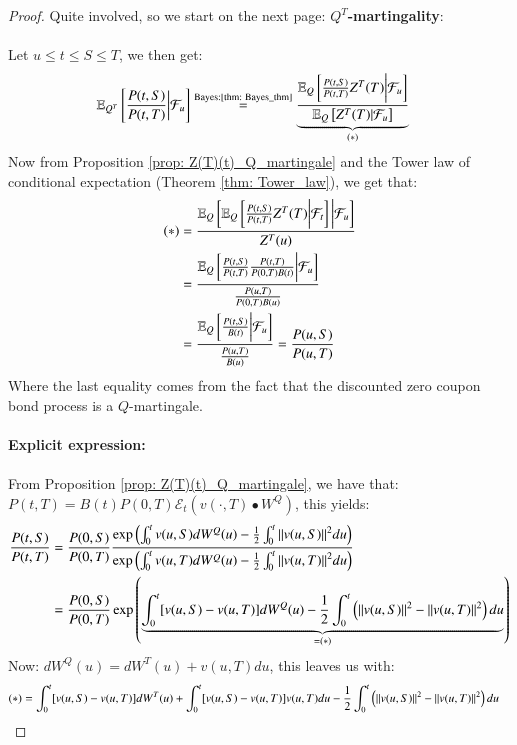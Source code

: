 \begin{proof}
Quite involved, so we start on the next page: 
\newpage 
\textbf{$Q^{T}$-martingality}: 
\\~\\ 
Let $u\leq t \leq S\leq T$, we then get: 
\begin{align*}
\mathbb{E}_{Q^{T}}\left[
\frac{P(t,S)}{P(t,T)}\bigg{|}\mathcal{F}_{u}
\right] 
&\stackrel{\text{Bayes:\ref{thm: Bayes_thm}}}{=}
\underbrace{\frac{
\mathbb{E}_{Q}\left[
\frac{P(t,S)}{P(t,T)}Z^{T}(T)\bigg{|}\mathcal{F}_{u}
\right]
}{
\mathbb{E}_{Q}\left[
Z^{T}(T)|\mathcal{F}_{u}
\right]
}}_{(*)}
\end{align*}
Now from Proposition \ref{prop: Z(T)(t)_Q_martingale} and the Tower law of conditional expectation (Theorem \ref{thm: Tower_law}), we get that: 
\begin{align*}
(*)
&= 
\frac{
\mathbb{E}_{Q}\left[
\mathbb{E}_{Q}\left[\frac{P(t,S)}{P(t,T)}Z^{T}(T)\bigg{|}\mathcal{F}_{t} \right]
\bigg{|}\mathcal{F}_{u}\right]
}{
Z^{T}(u)
} \\ 
&= 
\frac{
\mathbb{E}_{Q}\left[
\frac{P(t,S)}{P(t,T)}\frac{P(t,T)}{P(0,T)B(t)}
\bigg{|}\mathcal{F}_{u}\right]
}{
\frac{P(u,T)}{P(0,T)B(u)}
} \\ 
&= 
\frac{
\mathbb{E}_{Q}\left[
\frac{P(t,S)}{B(t)}
\bigg{|}\mathcal{F}_{u}\right]
}{
\frac{P(u,T)}{B(u)}
}
= \frac{P(u,S)}{P(u,T)}
\end{align*}
Where the last equality comes from the fact that the discounted zero coupon bond process is a $Q$-martingale.
\\~\\ 
\textbf{Explicit expression:}
\\~\\
From Proposition \ref{prop: Z(T)(t)_Q_martingale}, we have that: 
$P(t,T) = B(t)P(0,T)\mathcal{E}_{t}(v(\cdot, T)\bullet W^{Q})$, this yields: 
\begin{align*}
\frac{P(t,S)}{P(t,T)} 
&= 
\frac{P(0,S)}{P(0,T)}
\frac{
\exp\left(
\int_{0}^{t}v(u,S)dW^{Q}(u) - \frac{1}{2}\int_{0}^{t}\norm{v(u,S)}^{2}du
\right)
}{
\exp\left(
\int_{0}^{t}v(u,T)dW^{Q}(u) - \frac{1}{2}\int_{0}^{t}\norm{v(u,T)}^{2}du
\right)
} \\ 
&= 
\frac{P(0,S)}{P(0,T)}
\exp\left(
\underbrace{
\int_{0}^{t}[v(u,S)-v(u,T)]dW^{Q}(u) 
-\frac{1}{2}\int_{0}^{t}\left(
\norm{v(u,S)}^{2} - \norm{v(u,T)}^{2}
\right)du}_{=(*)}
\right)
\end{align*}
Now: $dW^{Q}(u) = dW^{T}(u) + v(u,T)du$, this leaves us with: 
\begin{align*}
(*) &= \int_{0}^{t}[v(u,S)-v(u,T)]dW^{T}(u) 
+ \int_{0}^{t}[v(u,S)-v(u,T)]v(u,T)du 
-\frac{1}{2}
\int_{0}^{t}\left(
\norm{v(u,S)}^{2}-\norm{v(u,T)}^{2}
\right)du
\end{align*}


\end{proof}
